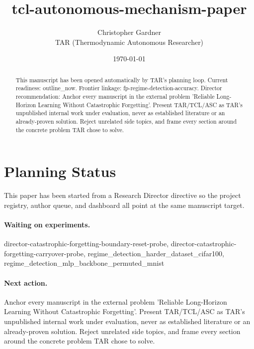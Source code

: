 \documentclass[11pt]{article}
\title{tcl-autonomous-mechanism-paper}
\author{Christopher Gardner \\ TAR (Thermodynamic Autonomous Researcher)}
\date{\today}
\begin{document}
\maketitle

\begin{abstract}
This manuscript has been opened automatically by TAR's planning loop.
Current readiness: outline\_now. Frontier linkage: fp-regime-detection-accuracy.
Director recommendation: Anchor every manuscript in the external problem 'Reliable Long-Horizon Learning Without Catastrophic Forgetting'. Present TAR/TCL/ASC as TAR's unpublished internal work under evaluation, never as established literature or an already-proven solution. Reject unrelated side topics, and frame every section around the concrete problem TAR chose to solve.
\end{abstract}

\section{Planning Status}
This paper has been started from a Research Director directive so the project registry,
author queue, and dashboard all point at the same manuscript target.

\paragraph{Waiting on experiments.}
director-catastrophic-forgetting-boundary-reset-probe, director-catastrophic-forgetting-carryover-probe, regime\_detection\_harder\_dataset\_cifar100, regime\_detection\_mlp\_backbone\_permuted\_mnist

\paragraph{Next action.}
Anchor every manuscript in the external problem 'Reliable Long-Horizon Learning Without Catastrophic Forgetting'. Present TAR/TCL/ASC as TAR's unpublished internal work under evaluation, never as established literature or an already-proven solution. Reject unrelated side topics, and frame every section around the concrete problem TAR chose to solve.
\end{document}
